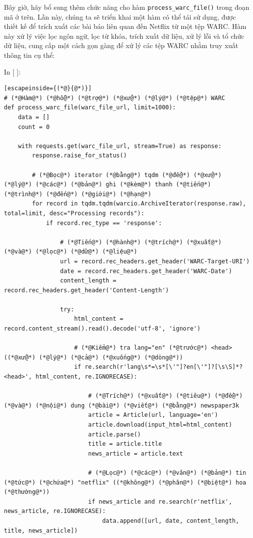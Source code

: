 Bây giờ, hãy bổ sung thêm chức năng cho hàm \texttt{process\_warc\_file()} trong đoạn mã ở trên. Lần này, chúng ta sẽ triển khai một hàm có thể tái sử dụng, được thiết kế để trích xuất các bài báo liên quan đến Netflix từ một tệp WARC. Hàm này xử lý việc lọc ngôn ngữ, lọc từ khóa, trích xuất dữ liệu, xử lý lỗi và tổ chức dữ liệu, cung cấp một cách gọn gàng để xử lý các tệp WARC nhằm truy xuất thông tin cụ thể:

In {[} {]}:

\begin{lstlisting}[escapeinside={(*@}{@*)}]
# (*@Hàm@*) (*@hỗ@*) (*@trợ@*) (*@xử@*) (*@lý@*) (*@tệp@*) WARC
def process_warc_file(warc_file_url, limit=1000):
    data = []
    count = 0

    with requests.get(warc_file_url, stream=True) as response:
        response.raise_for_status()

        # (*@Bọc@*) iterator (*@bằng@*) tqdm (*@để@*) (*@xử@*) (*@lý@*) (*@các@*) (*@bản@*) ghi (*@kèm@*) thanh (*@tiến@*) (*@trình@*) (*@đến@*) (*@giới@*) (*@hạn@*)
        for record in tqdm.tqdm(warcio.ArchiveIterator(response.raw), total=limit, desc="Processing records"):
            if record.rec_type == 'response':

                # (*@Tiến@*) (*@hành@*) (*@trích@*) (*@xuất@*) (*@và@*) (*@lọc@*) (*@dữ@*) (*@liệu@*)
                url = record.rec_headers.get_header('WARC-Target-URI')
                date = record.rec_headers.get_header('WARC-Date')
                content_length = record.rec_headers.get_header('Content-Length')

                try:
                    html_content = record.content_stream().read().decode('utf-8', 'ignore')

                    # (*@Kiểm@*) tra lang="en" (*@trước@*) <head> ((*@xử@*) (*@lý@*) (*@cả@*) (*@xuống@*) (*@dòng@*))
                    if re.search(r'lang\s*=\s*[\'"]?en[\'"]?[\s\S]*?<head>', html_content, re.IGNORECASE):

                        # (*@Trích@*) (*@xuất@*) (*@tiêu@*) (*@đề@*) (*@và@*) (*@nội@*) dung (*@bài@*) (*@viết@*) (*@bằng@*) newspaper3k
                        article = Article(url, language='en')
                        article.download(input_html=html_content)
                        article.parse()
                        title = article.title
                        news_article = article.text

                        # (*@Lọc@*) (*@các@*) (*@văn@*) (*@bản@*) tin (*@tức@*) (*@chứa@*) "netflix" ((*@không@*) (*@phân@*) (*@biệt@*) hoa (*@thường@*))
                        if news_article and re.search(r'netflix', news_article, re.IGNORECASE):
                            data.append([url, date, content_length, title, news_article])


\end{lstlisting}
